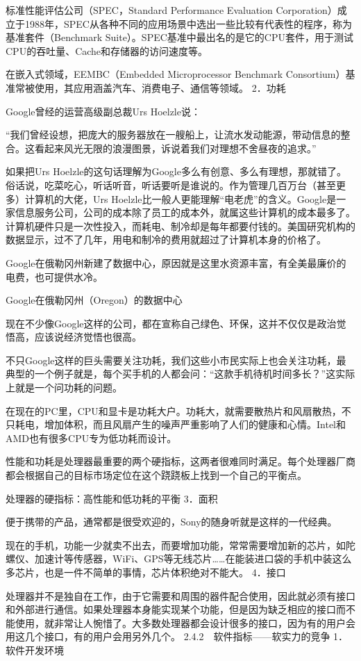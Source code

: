 \documentclass[12pt,UTF8]{ctexbook}
\begin{document}
标准性能评估公司（SPEC，Standard Performance Evaluation Corporation）成立于1988年，SPEC从各种不同的应用场景中选出一些比较有代表性的程序，称为基准套件（Benchmark Suite）。SPEC基准中最出名的是它的CPU套件，用于测试CPU的吞吐量、Cache和存储器的访问速度等。

在嵌入式领域，EEMBC（Embedded Microprocessor Benchmark Consortium）基准常被使用，其应用涵盖汽车、消费电子、通信等领域。
2．功耗

Google曾经的运营高级副总裁Urs Hoelzle说：

“我们曾经设想，把庞大的服务器放在一艘船上，让流水发动能源，带动信息的整合。这看起来风光无限的浪漫图景，诉说着我们对理想不舍昼夜的追求。”

如果把Urs Hoelzle的这句话理解为Google多么有创意、多么有理想，那就错了。俗话说，吃菜吃心，听话听音，听话要听是谁说的。作为管理几百万台（甚至更多）计算机的大佬，Urs Hoelzle比一般人更能理解“电老虎”的含义。Google是一家信息服务公司，公司的成本除了员工的成本外，就属这些计算机的成本最多了。计算机硬件只是一次性投入，而耗电、制冷却是每年都要付钱的。美国研究机构的数据显示，过不了几年，用电和制冷的费用就超过了计算机本身的价格了。

Google在俄勒冈州新建了数据中心，原因就是这里水资源丰富，有全美最廉价的电费，也可提供水冷。

Google在俄勒冈州（Oregon）的数据中心

现在不少像Google这样的公司，都在宣称自己绿色、环保，这并不仅仅是政治觉悟高，应该说经济觉悟也很高。

不只Google这样的巨头需要关注功耗，我们这些小市民实际上也会关注功耗，最典型的一个例子就是，每个买手机的人都会问：“这款手机待机时间多长？”这实际上就是一个问功耗的问题。

在现在的PC里，CPU和显卡是功耗大户。功耗大，就需要散热片和风扇散热，不只耗电，增加体积，而且风扇产生的噪声严重影响了人们的健康和心情。Intel和AMD也有很多CPU专为低功耗而设计。

性能和功耗是处理器最重要的两个硬指标，这两者很难同时满足。每个处理器厂商都会根据自己的目标市场定位在这个跷跷板上找到一个自己的平衡点。

处理器的硬指标：高性能和低功耗的平衡
3．面积

便于携带的产品，通常都是很受欢迎的，Sony的随身听就是这样的一代经典。

现在的手机，功能一少就卖不出去，而要增加功能，常常需要增加新的芯片，如陀螺仪、加速计等传感器，WiFi、GPS等无线芯片……在能装进口袋的手机中装这么多芯片，也是一件不简单的事情，芯片体积绝对不能大。
4．接口

处理器并不是独自在工作，由于它需要和周围的器件配合使用，因此就必须有接口和外部进行通信。如果处理器本身能实现某个功能，但是因为缺乏相应的接口而不能使用，就非常让人惋惜了。大多数处理器都会设计很多的接口，因为有的用户会用这几个接口，有的用户会用另外几个。
2.4.2　软件指标——软实力的竞争
1．软件开发环境
\end{document}
